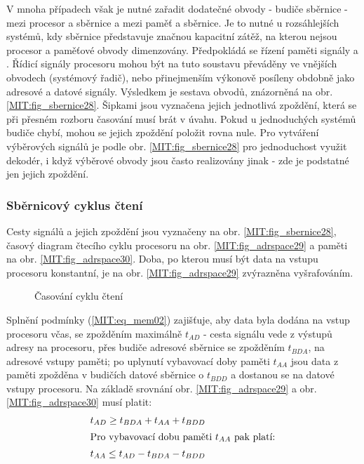       V mnoha případech však je nutné zařadit dodatečné obvody - budiče sběrnice - mezi procesor a 
      sběrnice a mezi paměť a sběrnice. Je to nutné u rozsáhlejších systémů, kdy sběrnice 
      představuje značnou kapacitní zátěž, na kterou nejsou procesor a paměťové obvody dimenzovány. 
      Předpokládá se řízení paměti signály a . Řídicí signály procesoru 
      mohou být na tuto soustavu převáděny ve vnějších obvodech (systémový řadič), nebo 
      přinejmenším výkonově posíleny obdobně jako adresové a datové signály. Výsledkem je sestava 
      obvodů, znázorněná na obr. \ref{MIT:fig_sbernice28}. Šipkami jsou vyznačena jejich jednotlivá 
      zpoždění, která se při přesném rozboru časování musí brát v úvahu. Pokud u jednoduchých 
      systémů budiče chybí, mohou se jejich zpoždění položit rovna nule. Pro vytváření výběrových 
      signálů je podle obr. \ref{MIT:fig_sbernice28} pro jednoduchost využit dekodér, i když 
      výběrové obvody jsou často realizovány jinak - zde je podstatné jen jejich zpoždění.
      
      \subsubsection{Sběrnicový cyklus čtení}
        Cesty signálů a jejich zpoždění jsou vyznačeny na obr. \ref{MIT:fig_sbernice28}, časový 
        diagram čtecího cyklu procesoru na obr. \ref{MIT:fig_adrspace29} a paměti na obr. 
        \ref{MIT:fig_adrspace30}. Doba, po kterou musí být data na vstupu procesoru konstantní, je 
        na obr. \ref{MIT:fig_adrspace29} zvýrazněna vyšrafováním.
        
        \begin{figure}[ht!]
          \centering  
          \caption{Časování cyklu čtení}
          \label{MIT:fig_sbernice2930}
        \end{figure}
       
        Splnění podmínky (\ref{MIT:eq_mem02}) zajišťuje, aby data byla dodána na vstup procesoru 
        včas, se zpožděním maximálně \(t_{AD}\) - cesta signálu vede z výstupů adresy na procesoru, 
        přes budiče adresové sběrnice se zpožděním \(t_{BDA}\), na adresové vstupy paměti; po 
        uplynutí vybavovací doby paměti \(t_{AA}\) jsou data z paměti zpožděna v budičích datové 
        sběrnice o \(t_{BDD}\) a dostanou se na datové vstupy procesoru. Na základě srovnání obr. 
        \ref{MIT:fig_adrspace29} a obr. \ref{MIT:fig_adrspace30} musí platit:        
        \begin{align}
          t_{AD} \geq t_{BDA} + t_{AA} + t_{BDD} \label{MIT:eq_mem01}            \\
          \shortintertext{Pro vybavovací dobu paměti \(t_{AA}\) pak platí:}
          t_{AA} \leq t_{AD} - t_{BDA} - t_{BDD} \label{MIT:eq_mem02}
        \end{align}
        
